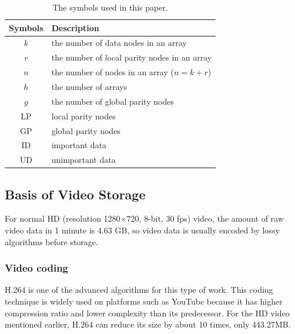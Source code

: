 \documentclass[sigconf]{acmart}
\begin{document}
\begin{table}[]
\caption{The symbols used in this paper.}\label{parameter}
\centering
\begin{tabular}{|c|l|}
\hline
Symbols & Description \\ \hline
$k$ & the number of data nodes in an array \\ \hline
$r$ & the number of local parity nodes in an array \\ \hline
$n$ & the number of nodes in an array ($n=k+r$) \\ \hline
$h$ & the number of arrays \\ \hline
$g$ & the number of global parity nodes \\ \hline
LP & local parity nodes \\ \hline
GP & global parity nodes \\ \hline
ID & important data \\ \hline
UD & unimportant data \\ \hline
\end{tabular}
\end{table}


\subsection{Basis of Video Storage}\label{video storage}
For normal HD (resolution 1280$\times$720, 8-bit, 30 fps) video, the amount of raw video data in 1 minute is 4.63 GB, so video data is usually encoded by lossy algorithms before storage. 

\subsubsection{Video coding}
H.264 is one of the advanced algorithms for this type of work. This coding technique is widely used on platforms such as YouTube because it has higher compression ratio and lower complexity than its predecessor. For the HD video mentioned earlier, H.264 can reduce its size by about 10 times, only 443.27MB.
\end{document}
